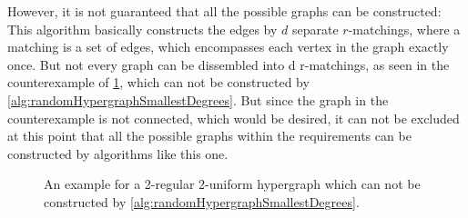 However, it is not guaranteed that all the possible graphs can be constructed: %
This algorithm basically constructs the edges by $d$ separate $r$-matchings, where a matching is a set of edges, which encompasses each vertex in the graph exactly once. %
But not every graph can be dissembled into d r-matchings, as seen in the counterexample of \cref{fig:counterexample_matching}, which can not be constructed by \cref{alg:randomHypergraphSmallestDegrees}. But since the graph in the counterexample is not connected, which would be desired, it can not be excluded at this point that all the possible graphs within the requirements can be constructed by algorithms like this one.
 

\begin{figure} [htpb]
	\centering
	\caption[Counterexample hypergraph]{An example for a 2-regular 2-uniform hypergraph which can not be constructed by \cref{alg:randomHypergraphSmallestDegrees}.  }\label{fig:counterexample_matching}
\end{figure}

